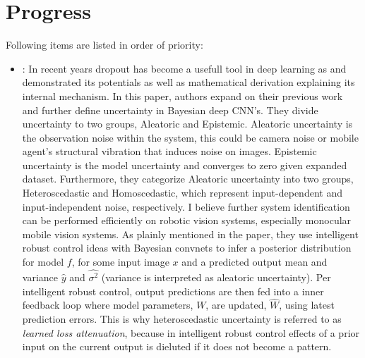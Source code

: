 \documentclass[11pt]{article}
\begin{document}
\section{Progress}
Following items are listed in order of priority:
\begin{itemize}

	\item \cite{kendall2017uncertainties}: In recent years dropout has become a
	      usefull tool in deep learning as \cite{gal2016dropout} and
	      \cite{kendall2016modelling} demonstrated its potentials as well as
	      mathematical derivation explaining its internal mechanism. In this paper,
	      authors expand on their previous work and further define uncertainty in
	      Bayesian deep CNN's. They divide uncertainty to two groups, Aleatoric and
	      Epistemic. Aleatoric uncertainty is the observation noise within the system,
	      this could be camera noise or mobile agent's structural vibration that
	      induces noise on images. Epistemic uncertainty is the model uncertainty and
	      converges to zero given expanded dataset. Furthermore, they categorize
	      Aleatoric uncertainty into two groups, Heteroscedastic and Homoscedastic,
	      which represent input-dependent and input-independent noise, respectively.
	      I believe further system identification can be performed efficiently on
	      robotic vision systems, especially monocular mobile vision systems. As
	      plainly mentioned in the paper, they use intelligent robust control ideas
	      with Bayesian convnets to infer a posterior distribution for model \(f\),
	      for some input image \(x\) and a predicted output mean and variance
	      \(\hat{y}\) and \( \hat{\sigma^{2}}\) (variance is interpreted as
	      aleatoric uncertainty). Per intelligent robust control, output predictions
	      are then fed into a inner feedback loop where model parameters, \(W\),
	      are updated, \(\hat{W}\), using latest prediction errors. This is why
	      heteroscedastic uncertainty is referred to as \textit{learned loss attenuation},
	      because in intelligent robust control effects of a prior input on the
	      current output is dieluted if it does not become a pattern.



\end{itemize}
\end{document}
